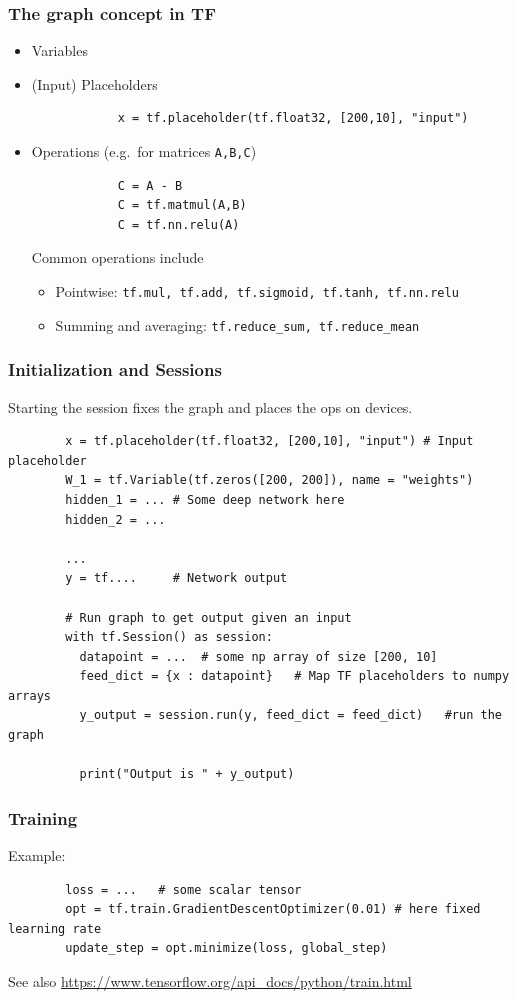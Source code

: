 \documentclass[mathserif]{beamer}
\begin{document}
\begin{frame}[fragile]
	\frametitle{The graph concept in TF}
		
	
	\begin{itemize}		
		\item Variables
		\item (Input) Placeholders
		\begin{verbatim}
			x = tf.placeholder(tf.float32, [200,10], "input")
		\end{verbatim}
		\item Operations (e.g.\ for matrices \texttt{A,B,C})
		\begin{verbatim}
			C = A - B
			C = tf.matmul(A,B)
			C = tf.nn.relu(A)
		\end{verbatim}
		Common operations include
		
		\begin{itemize}
			
			\item\footnotesize Pointwise: \texttt{tf.mul, tf.add, tf.sigmoid, tf.tanh, tf.nn.relu}
			\item\footnotesize Summing and averaging: \texttt{tf.reduce\_sum, tf.reduce\_mean}		
		\end{itemize}		
	\end{itemize}
\end{frame}


\begin{frame}[fragile]
	\frametitle{Initialization and Sessions}
	  Starting the session fixes the graph and places the ops on devices.
	
	\begin{verbatim}
		x = tf.placeholder(tf.float32, [200,10], "input") # Input placeholder
		W_1 = tf.Variable(tf.zeros([200, 200]), name = "weights")
		hidden_1 = ... # Some deep network here
		hidden_2 = ...
		
		...
		y = tf....     # Network output
		
		# Run graph to get output given an input
		with tf.Session() as session:
		  datapoint = ...  # some np array of size [200, 10]
		  feed_dict = {x : datapoint}	# Map TF placeholders to numpy arrays
		  y_output = session.run(y, feed_dict = feed_dict)   #run the graph
		  
		  print("Output is " + y_output)
	\end{verbatim}
\end{frame}


\begin{frame}[fragile]
	\frametitle{Training}
	Example:
	\begin{verbatim}
		loss = ...   # some scalar tensor
		opt = tf.train.GradientDescentOptimizer(0.01) # here fixed learning rate
		update_step = opt.minimize(loss, global_step)
	\end{verbatim}
	
	See also \url{https://www.tensorflow.org/api_docs/python/train.html}
\end{frame}
\end{document}
